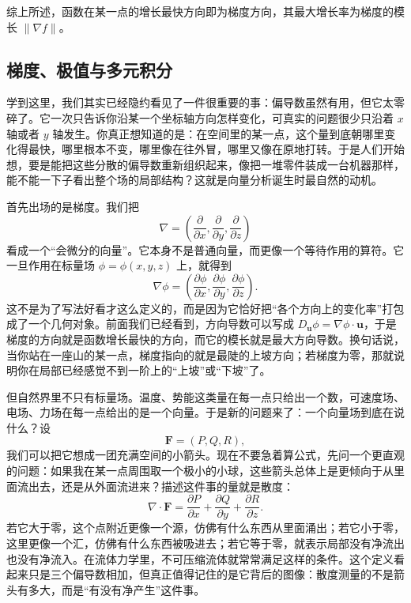 \documentclass[UTF8]{ctexbook}
\begin{document}
综上所述，函数在某一点的增长最快方向即为梯度方向，其最大增长率为梯度的模长 $\|\nabla f\|$。

\subsection{梯度、极值与多元积分}

学到这里，我们其实已经隐约看见了一件很重要的事：偏导数虽然有用，但它太零碎了。它一次只告诉你沿某一个坐标轴方向怎样变化，可真实的问题很少只沿着 $x$ 轴或者 $y$ 轴发生。你真正想知道的是：在空间里的某一点，这个量到底朝哪里变化得最快，哪里根本不变，哪里像在往外冒，哪里又像在原地打转。于是人们开始想，要是能把这些分散的偏导数重新组织起来，像把一堆零件装成一台机器那样，能不能一下子看出整个场的局部结构？这就是向量分析诞生时最自然的动机。

首先出场的是梯度。我们把
\[
\nabla=\left(\frac{\partial}{\partial x},\frac{\partial}{\partial y},\frac{\partial}{\partial z}\right)
\]
看成一个“会微分的向量”。它本身不是普通向量，而更像一个等待作用的算符。它一旦作用在标量场 $\phi=\phi(x,y,z)$ 上，就得到
\[
\nabla\phi=
\left(\frac{\partial \phi}{\partial x},\frac{\partial \phi}{\partial y},\frac{\partial \phi}{\partial z}\right).
\]
这不是为了写法好看才这么定义的，而是因为它恰好把“各个方向上的变化率”打包成了一个几何对象。前面我们已经看到，方向导数可以写成 $D_{\mathbf u}\phi=\nabla\phi\cdot\mathbf u$，于是梯度的方向就是函数增长最快的方向，而它的模长就是最大方向导数。换句话说，当你站在一座山的某一点，梯度指向的就是最陡的上坡方向；若梯度为零，那就说明你在局部已经感觉不到一阶上的“上坡”或“下坡”了。

但自然界里不只有标量场。温度、势能这类量在每一点只给出一个数，可速度场、电场、力场在每一点给出的是一个向量。于是新的问题来了：一个向量场到底在说什么？设
\[
\mathbf{F}=(P,Q,R),
\]
我们可以把它想成一团充满空间的小箭头。现在不要急着算公式，先问一个更直观的问题：如果我在某一点周围取一个极小的小球，这些箭头总体上是更倾向于从里面流出去，还是从外面流进来？描述这件事的量就是散度：
\[
\nabla\cdot\mathbf{F}=\frac{\partial P}{\partial x}+\frac{\partial Q}{\partial y}+\frac{\partial R}{\partial z}.
\]
若它大于零，这个点附近更像一个源，仿佛有什么东西从里面涌出；若它小于零，这里更像一个汇，仿佛有什么东西被吸进去；若它等于零，就表示局部没有净流出也没有净流入。在流体力学里，不可压缩流体就常常满足这样的条件。这个定义看起来只是三个偏导数相加，但真正值得记住的是它背后的图像：散度测量的不是箭头有多大，而是“有没有净产生”这件事。
\end{document}
